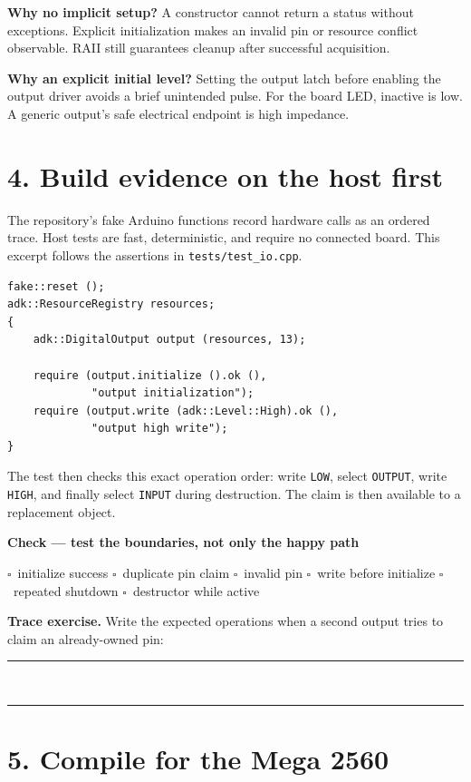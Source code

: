 \documentclass[11pt]{article}
\newcommand{\blankline}{\rule{0.96\linewidth}{0.35pt}}
\newcommand{\checkbox}{\(\square\)}
\newenvironment{checkpoint}[1]
{\begin{center}\begin{minipage}{0.94\linewidth}\textbf{Check --- #1}\par}
{\end{minipage}\end{center}}
\begin{document}
\textbf{Why no implicit setup?} A constructor cannot return a status without
exceptions. Explicit initialization makes an invalid pin or resource conflict
observable. RAII still guarantees cleanup after successful acquisition.

\textbf{Why an explicit initial level?} Setting the output latch before enabling
the output driver avoids a brief unintended pulse. For the board LED, inactive
is low. A generic output's safe electrical endpoint is high impedance.

\section*{4. Build evidence on the host first}

The repository's fake Arduino functions record hardware calls as an ordered
trace. Host tests are fast, deterministic, and require no connected board.
This excerpt follows the assertions in \texttt{tests/test\_io.cpp}.

\begin{lstlisting}[style=adkcpp]
fake::reset ();
adk::ResourceRegistry resources;
{
    adk::DigitalOutput output (resources, 13);

    require (output.initialize ().ok (),
             "output initialization");
    require (output.write (adk::Level::High).ok (),
             "output high write");
}
\end{lstlisting}

The test then checks this exact operation order: write \texttt{LOW}, select
\texttt{OUTPUT}, write \texttt{HIGH}, and finally select \texttt{INPUT} during
destruction. The claim is then available to a replacement object.

\begin{checkpoint}{test the boundaries, not only the happy path}
\checkbox\ initialize success \quad
\checkbox\ duplicate pin claim \quad
\checkbox\ invalid pin \quad
\checkbox\ write before initialize \quad
\checkbox\ repeated shutdown \quad
\checkbox\ destructor while active
\end{checkpoint}

\textbf{Trace exercise.} Write the expected operations when a second output
tries to claim an already-owned pin:

\blankline\\[5pt]\blankline

\section*{5. Compile for the Mega 2560}
\end{document}
